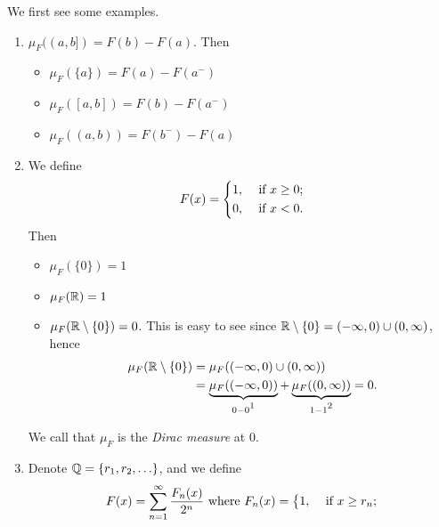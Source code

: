 \begin{eg}
	We first see some examples.
	\begin{enumerate}
		\item \(\mu _F((a, b]) = F(b) - F(a)\). Then
		      \begin{itemize}
			      \item \(\mu _F(\{a\}) = F(a) - F(a^-)\)
			      \item \(\mu _F([a, b]) = F(b) - F(a^-)\)
			      \item \(\mu _F((a, b)) = F(b^-) - F(a)\)
		      \end{itemize}
		\item We define
		      \[
			      F(x) = \begin{dcases}
				      1, & \text{ if } x\geq 0 ; \\
				      0, & \text{ if } x<0.
			      \end{dcases}
		      \]
		      Then
		      \begin{itemize}
			      \item \(\mu _F(\{0\})=1\)
			      \item \(\mu _F(\mathbb{\MakeUppercase{r}} ) = 1\)
			      \item \(\mu _F(\mathbb{\MakeUppercase{r}}\setminus \{0\} ) = 0\). This is easy to see since \(\mathbb{\MakeUppercase{r}} \setminus \{0\} = (-\infty , 0)\cup (0, \infty )\), hence
			            \[
				            \begin{split}
					            \mu _F(\mathbb{\MakeUppercase{r}} \setminus \{0\}) &= \mu _F((-\infty , 0)\cup (0, \infty ))\\
					            &= \underbrace{\mu _F((-\infty , 0))}_{0 - 0\footnotemark } + \underbrace{\mu _F((0, \infty ))}_{1 -1 \footnotemark }= 0.
				            \end{split}
			            \]
			            \addtocounter{footnote}{-2}
		      \end{itemize}
		      We call that \(\mu _F\) is the \emph{Dirac measure} at \(0\).
		\item Denote \(\mathbb{\MakeUppercase{q}} = \{r_1, r_2, \ldots  \}\), and we define
		      \[
			      F(x) = \sum\limits_{n=1}^{\infty} \frac{F_n(x)}{2^n} \text{ where }  F_{n}(x) = \begin{dcases}
				      1, & \text{ if } x\geq r_n; \\

\end{dcases}\]
\end{enumerate}
\end{eg}
